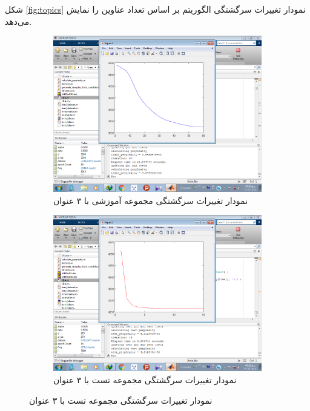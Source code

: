 \documentclass[11.5pt,a4paper]{article}
\begin{document}
شکل 
\ref{fig:topics}
نمودار تغییرات سرگشتگی الگوریتم بر اساس تعداد عناوین را نمایش می‌دهد.


\begin{figure}[h]
\center
	\begin{subfigure}{.45\textwidth}
		\includegraphics[scale=0.25]{Imgs/k3_b05_a003_25s_ptr3648938.png}
		\caption{نمودار تغییرات سرگشتگی مجموعه‌ آموزشی با ۳ عنوان}
	\end{subfigure}
	\begin{subfigure}{.45\textwidth}
		\includegraphics[scale=0.25]{Imgs/k3_b05_a003_8s_pts4212840.png}
		\caption{نمودار تغییرات سرگشتگی مجموعه‌ تست با ۳ عنوان}
	\end{subfigure}


\end{figure}
\end{document}
